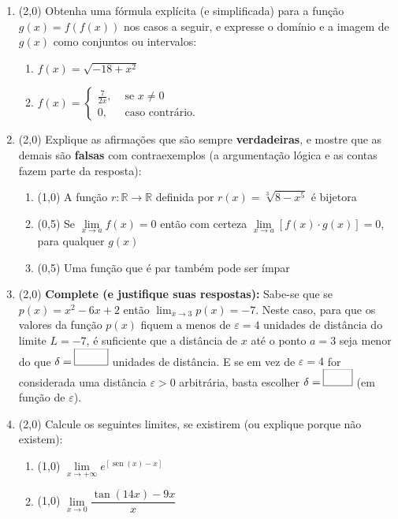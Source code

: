 \documentclass[12pt,a4paper]{article}
\newcommand*\sen{\operatorname{sen}}
\begin{document}
\begin{enumerate}
\item (2,0) Obtenha uma fórmula explícita (e simplificada) para a função $g(x) = f( f(x) )$ nos casos a seguir, e expresse o domínio e a imagem de $g(x)$ como conjuntos ou intervalos:
\begin{multicols}{2}
\begin{enumerate}
\item $f(x) = \sqrt{ -18 + x^2}$
\item $f(x) = \begin{cases}
\frac{7}{2x},& \text{ se } x \neq 0\\
0, & \text{ caso contrário.}
\end{cases}$
\end{enumerate}
\end{multicols}

\item (2,0) Explique as afirmações que são sempre \textbf{verdadeiras}, e mostre que as demais são \textbf{falsas} com contraexemplos (a argumentação lógica e as contas fazem parte da resposta):
\begin{enumerate}
\item (1,0) A função $r: \mathbb{R} \to \mathbb{R}$ definida por $\displaystyle r(x) = \sqrt[3]{8 - x^5}$ é bijetora
\item (0,5) Se $\lim\limits_{x\to a} f(x) = 0$ então com certeza $\lim\limits_{x\to a} [ f(x) \cdot g(x) ] = 0$, para qualquer $g(x)$
\item (0,5) Uma função que é par também pode ser ímpar
\end{enumerate}

\item (2,0) \textbf{Complete (e justifique suas respostas):} Sabe-se que se $p(x) = x^2 - 6x + 2$ então $\lim_{x \to 3} p(x) = -7$. Neste caso, para que os valores da função $p(x)$ fiquem a menos de $\varepsilon = 4$ unidades de distância do limite $L = -7$, é suficiente que a distância de $x$ até o ponto $a = 3$ seja menor do que $\delta = \framebox(30,15){}$ unidades de distância. E se em vez de $\varepsilon = 4$ for considerada uma distância $\varepsilon > 0$ arbitrária, basta escolher $\delta = \framebox(26,15){}$ (em função de $\varepsilon$).

\item (2,0) Calcule os seguintes limites, se existirem (ou explique porque não existem):
\begin{enumerate}
\item (1,0) $\lim\limits_{x\to +\infty} e^{[\sen(x)-x]}$
\item (1,0) $\lim\limits_{x\to 0} \dfrac{\tan(14x) - 9x}{x}$
\end{enumerate}


\end{enumerate}
\end{document}

